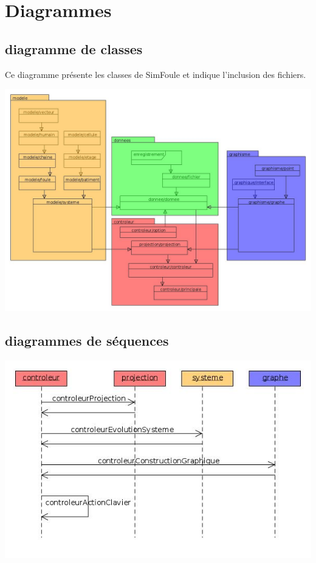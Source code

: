 %
\section{Diagrammes}
%
%
\subsection{diagramme de classes}
%
Ce diagramme présente les classes de SimFoule et indique l'inclusion des fichiers.
%
\begin{center}
\includegraphics[scale=0.45]{./illustration/classesSimFoule}
\end{center}
%
%
\subsection{diagrammes de séquences}
%
\begin{center}
\includegraphics[scale=0.51]{./illustration/sequenceControleur}
\end{center}
%



